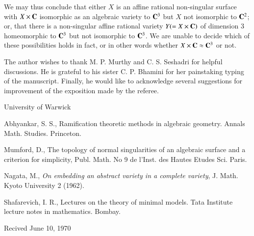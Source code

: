 We may thus conclude that either $X$ is an affine rational non-singular surface with $X \times \mathbf{C}$ isomorphic as an algebraic variety to $\mathbf{C}^3$ but $X$ not isomorphic to $\mathbf{C}^2$; or, that there is a non-singular affine rational variety $Y (=  X \times \mathbf{C})$ of dimension 3 homeomorphic to $\mathbf{C}^3$ but not isomorphic to $\mathbf{C}^3$. We are unable to decide which of these possibilities holds in fact, or in other words whether $X \times \mathbf{C} \approx \mathbf{C}^3$ or not.

The author wishes to thank M. P. Murthy and C. S. Seshadri for helpful discussions. He is grateful to his sister C. P. Bhamini for her painstaking typing of the manuscript. Finally, he would like to acknowledge several suggestions for improvement of the exposition made by the referee. 

University of Warwick

\begin{thebibliography}{99}
 Abhyankar,  S. S., Ramification theoretic methods in algebraic geometry. Annals Math. Studies. Princeton.

 Mumford, D., The topology of normal singularities of an algebraic surface and a criterion for simplicity, Publ. Math. No 9 de l'Inst. des Hautes Etudes Sci. Paris. 

 Nagata, M., {\em On embedding an abstract variety in a complete variety}, J. Math. Kyoto University 2 (1962).

 Shafarevich, I. R., Lectures on the theory of minimal models. Tata Institute lecture notes in mathematics. Bombay.
\end{thebibliography}

\begin{center}
{Recived June 10, 1970}
\end{center}



